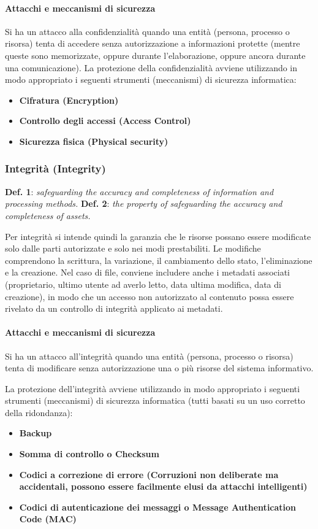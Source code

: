 \paragraph{Attacchi e meccanismi di sicurezza}
Si ha un attacco alla confidenzialità quando una entità (persona, processo o risorsa) tenta di accedere senza autorizzazione a informazioni protette (mentre queste sono memorizzate, oppure durante l'elaborazione, oppure ancora durante una comunicazione). La protezione della confidenzialità avviene utilizzando in modo appropriato i seguenti strumenti (meccanismi) di sicurezza informatica:
\begin{itemize} 
  \item \textbf{Cifratura (Encryption)}
  \item \textbf{Controllo degli accessi (Access Control)}
  \item \textbf{Sicurezza fisica (Physical security)}
\end{itemize}

\subsubsection{Integrità (Integrity)}
\textbf{Def. 1}: \textit{safeguarding the accuracy and completeness of information and processing methods.}\newline
\textbf{Def. 2}: \textit{the property of safeguarding the accuracy and completeness of assets.}\newline


Per integrità si intende quindi la garanzia che le risorse possano essere modificate solo dalle parti autorizzate e solo nei modi prestabiliti. Le modifiche comprendono la scrittura, la variazione, il cambiamento dello stato, l'eliminazione e la creazione. Nel caso di file, conviene includere anche i metadati associati (proprietario, ultimo utente ad averlo letto, data ultima modifica, data di creazione), in modo che un accesso non autorizzato al contenuto possa essere rivelato da un controllo di integrità applicato ai metadati.

\paragraph{Attacchi e meccanismi di sicurezza}
Si ha un attacco all'integrità quando una entità (persona, processo o risorsa) tenta di modificare senza autorizzazione una o più risorse del sistema informativo.

 La protezione dell'integrità avviene utilizzando in modo appropriato i seguenti strumenti (meccanismi) di sicurezza informatica (tutti basati su un uso corretto della ridondanza):
\begin{itemize} 
  \item \textbf{Backup}
  \item \textbf{Somma di controllo o Checksum}
  \item \textbf{Codici a correzione di errore (Corruzioni non deliberate ma accidentali, possono essere facilmente elusi da attacchi intelligenti)}
  \item \textbf{Codici di autenticazione dei messaggi o Message Authentication Code (MAC)} 
\end{itemize}


